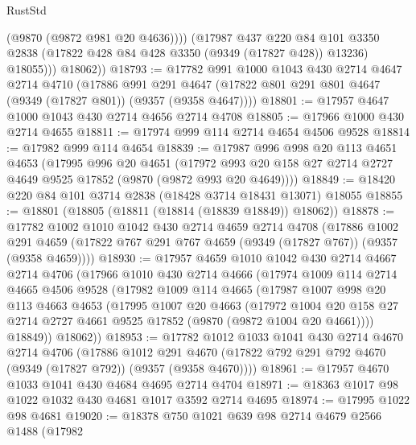 \begin{lexlean}{RustStd}
\begin{coremodule}
                (@9870 (@9872 @981 @20 @4636))))
            (@17987
              @437
              @220
              @84
              @101
              @3350
              @2838
              (@17822 @428 @84 @428 @3350 (@9349 (@17827 @428)) @13236)
              @18055)))
        @18062))
@18793 := @17782
    @991
    @1000
    @1043
    @430
    @2714
    @4647
    @2714
    @4710
    (@17886
      @991
      @291
      @4647
      (@17822 @801 @291 @801 @4647 (@9349 (@17827 @801)) (@9357 (@9358 @4647))))
@18801 := @17957 @4647 @1000 @1043 @430 @2714 @4656 @2714 @4708
@18805 := @17966 @1000 @430 @2714 @4655
@18811 := @17974 @999 @114 @2714 @4654 @4506 @9528
@18814 := @17982 @999 @114 @4654
@18839 := @17987
    @996
    @998
    @20
    @113
    @4651
    @4653
    (@17995
      @996
      @20
      @4651
      (@17972 @993 @20 @158 @27 @2714 @2727 @4649 @9525 @17852 (@9870 (@9872 @993 @20 @4649))))
@18849 := @18420 @220 @84 @101 @3714 @2838 (@18428 @3714 @18431 @13071) @18055
@18855 := @18801 (@18805 (@18811 (@18814 (@18839 @18849)) @18062))
@18878 := @17782
    @1002
    @1010
    @1042
    @430
    @2714
    @4659
    @2714
    @4708
    (@17886
      @1002
      @291
      @4659
      (@17822 @767 @291 @767 @4659 (@9349 (@17827 @767)) (@9357 (@9358 @4659))))
@18930 := @17957
    @4659
    @1010
    @1042
    @430
    @2714
    @4667
    @2714
    @4706
    (@17966
      @1010
      @430
      @2714
      @4666
      (@17974
        @1009
        @114
        @2714
        @4665
        @4506
        @9528
        (@17982
          @1009
          @114
          @4665
          (@17987
            @1007
            @998
            @20
            @113
            @4663
            @4653
            (@17995
              @1007
              @20
              @4663
              (@17972
                @1004
                @20
                @158
                @27
                @2714
                @2727
                @4661
                @9525
                @17852
                (@9870 (@9872 @1004 @20 @4661))))
            @18849))
        @18062))
@18953 := @17782
    @1012
    @1033
    @1041
    @430
    @2714
    @4670
    @2714
    @4706
    (@17886
      @1012
      @291
      @4670
      (@17822 @792 @291 @792 @4670 (@9349 (@17827 @792)) (@9357 (@9358 @4670))))
@18961 := @17957 @4670 @1033 @1041 @430 @4684 @4695 @2714 @4704
@18971 := @18363 @1017 @98 @1022 @1032 @430 @4681 @1017 @3592 @2714 @4695
@18974 := @17995 @1022 @98 @4681
@19020 := @18378
    @750
    @1021
    @639
    @98
    @2714
    @4679
    @2566
    @1488
    (@17982

\end{coremodule}
\end{lexlean}
